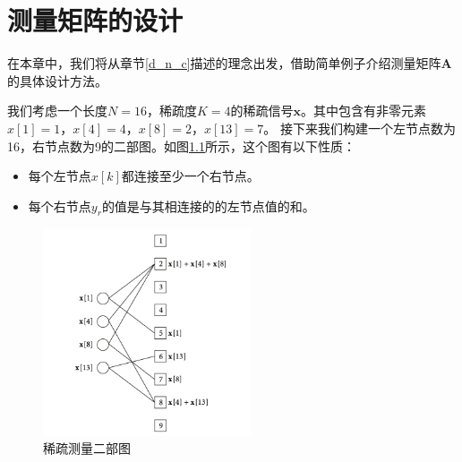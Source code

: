 \documentclass[AutoFakeBold]{LZUThesis}
\begin{document}
\chapter{测量矩阵的设计}
\label{2}
在本章中，我们将从章节\ref{d_n_c}描述的理念出发，借助简单例子介绍测量矩阵$\mathbf{A}$的具体设计方法。

我们考虑一个长度$N=16$，稀疏度$K=4$的稀疏信号$\mathbf{x}$。其中包含有非零元素$x[1] = 1$，$x[4] = 4$，$x[8] = 2$，$x[13] = 7$。
接下来我们构建一个左节点数为16，右节点数为9的二部图。如图\ref{fig_bip_graph}所示，这个图有以下性质：

\begin{itemize}
    \item 每个左节点$x[k]$都连接至少一个右节点。
    \item 每个右节点$y_r$的值是与其相连接的的左节点值的和。
\end{itemize}

\begin{figure}[H]
    \centering
    \includegraphics[width=0.55\textwidth]{figures/bip_g.png}
    \caption{稀疏测量二部图}
    \label{fig_bip_graph}
\end{figure}
\end{document}
